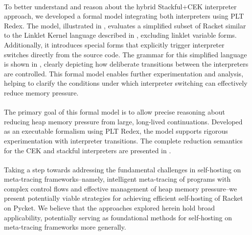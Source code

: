       \paragraph{}%
        To better understand and reason about the hybrid Stackful+CEK interpreter approach, we developed a formal model integrating both interpreters using PLT Redex. The model, illustrated in , evaluates a simplified subset of Racket similar to the Linklet Kernel language described in , excluding linklet variable forms. Additionally, it introduces special  forms that explicitly trigger interpreter switches directly from the source code. The grammar for this simplified language is shown in , clearly depicting how deliberate transitions between the interpreters are controlled. This formal model enables further experimentation and analysis, helping to clarify the conditions under which interpreter switching can effectively reduce memory pressure.

      \paragraph{}%
        The primary goal of this formal model is to allow precise reasoning about reducing heap memory pressure from large, long-lived continuations. Developed as an executable formalism using PLT Redex, the model supports rigorous experimentation with interpreter transitions. The complete reduction semantics for the CEK and stackful interpreters are presented in .


      \paragraph{}%
        Taking a step towards addressing the fundamental challenges in self-hosting on meta-tracing frameworks--namely, intelligent meta-tracing of programs with complex control flows and effective management of heap memory pressure--we present potentially viable strategies for achieving efficient self-hosting of Racket on Pycket. We believe that the approaches explored herein hold broad applicability, potentially serving as foundational methods for self-hosting on meta-tracing frameworks more generally.



